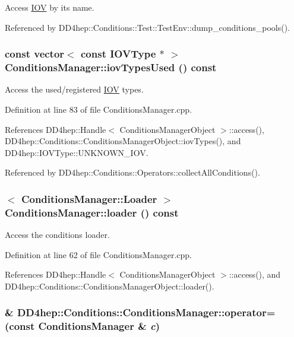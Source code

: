 Access \hyperlink{class_d_d4hep_1_1_i_o_v}{IOV} by its name. 

Referenced by DD4hep::Conditions::Test::TestEnv::dump\_\-conditions\_\-pools().\hypertarget{class_d_d4hep_1_1_conditions_1_1_conditions_manager_a01a57795e2d1ae0fba2f2f6348be5c46}{
\subsubsection[{iovTypesUsed}]{\setlength{\rightskip}{0pt plus 5cm}const {\bf vector}$<$ const {\bf IOVType} $\ast$ $>$ ConditionsManager::iovTypesUsed () const}}
\label{class_d_d4hep_1_1_conditions_1_1_conditions_manager_a01a57795e2d1ae0fba2f2f6348be5c46}


Access the used/registered \hyperlink{class_d_d4hep_1_1_i_o_v}{IOV} types. 

Definition at line 83 of file ConditionsManager.cpp.

References DD4hep::Handle$<$ ConditionsManagerObject $>$::access(), DD4hep::Conditions::ConditionsManagerObject::iovTypes(), and DD4hep::IOVType::UNKNOWN\_\-IOV.

Referenced by DD4hep::Conditions::Operators::collectAllConditions().\hypertarget{class_d_d4hep_1_1_conditions_1_1_conditions_manager_ad7474bdaff36fc37418bdfbe2c278383}{
\subsubsection[{loader}]{$<$ {\bf ConditionsManager::Loader} $>$ ConditionsManager::loader () const}}
\label{class_d_d4hep_1_1_conditions_1_1_conditions_manager_ad7474bdaff36fc37418bdfbe2c278383}


Access the conditions loader. 

Definition at line 62 of file ConditionsManager.cpp.

References DD4hep::Handle$<$ ConditionsManagerObject $>$::access(), and DD4hep::Conditions::ConditionsManagerObject::loader().\hypertarget{class_d_d4hep_1_1_conditions_1_1_conditions_manager_a4bffb6047b5d192da0a630dd347616eb}{
\subsubsection[{operator=}]{\& DD4hep::Conditions::ConditionsManager::operator= (const {\bf ConditionsManager} \& {\em c})}}
\label{class_d_d4hep_1_1_conditions_1_1_conditions_manager_a4bffb6047b5d192da0a630dd347616eb}


